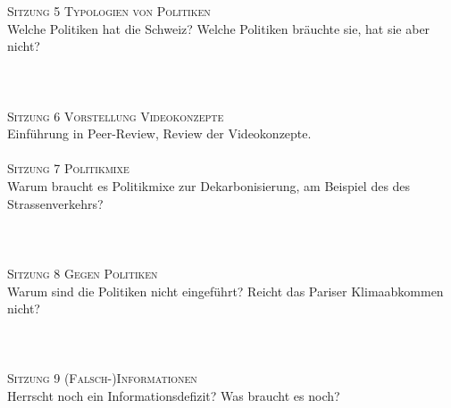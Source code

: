 \documentclass[12pt,a4paper]{article}
\begin{document}
\textsc{Sitzung 5 \dotfill Typologien von Politiken}  \smallskip \\ 
{\color{darkgreen}{\Rectangle}} Welche Politiken hat die Schweiz? Welche Politiken bräuchte sie, hat sie aber nicht? \\
{\color{darkgreen}{\Rectangle}} \\
{\color{darkgreen}{\Rectangle}} \\
\medskip  \\	

\textsc{Sitzung 6 \dotfill Vorstellung Videokonzepte} \smallskip \\ 
{\color{darkgreen}{\Rectangle}} Einführung in Peer-Review, Review der Videokonzepte.\\
\medskip  \\	


\textsc{Sitzung 7 \dotfill Politikmixe} \smallskip \\ 
{\color{darkgreen}{\Rectangle}} Warum braucht es Politikmixe zur Dekarbonisierung, am Beispiel des des Strassenverkehrs? \\ 
{\color{darkgreen}{\Rectangle}}  \\  
{\color{darkgreen}{\Rectangle}}  \\  
\medskip  \\	


\textsc{Sitzung 8 \dotfill Gegen Politiken}  \smallskip \\ 
{\color{darkgreen}{\Rectangle}}  Warum sind die Politiken nicht eingeführt? Reicht das Pariser Klimaabkommen nicht? \\%
{\color{darkgreen}{\Rectangle}}  \\
{\color{darkgreen}{\Rectangle}}  \\  
\medskip  \\	


\textsc{Sitzung 9 \dotfill (Falsch-)Informationen}  \smallskip \\ 
{\color{darkgreen}{\Rectangle}} Herrscht noch ein Informationsdefizit? Was braucht es noch? \\
{\color{darkgreen}{\Rectangle}}  \\
{\color{darkgreen}{\Rectangle}}  \\
\medskip  \\	
\end{document}
